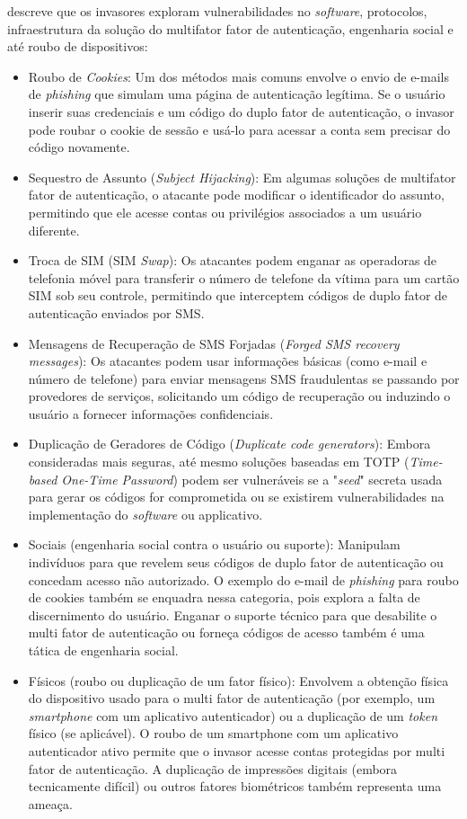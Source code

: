 \documentclass[12pt]{article}
\begin{document}
\cite{article:3} descreve que os invasores exploram vulnerabilidades no \textit{software},
protocolos, infraestrutura da solução do multifator fator de autenticação, engenharia social
e até roubo de dispositivos:
\begin{itemize}
  \item Roubo de \textit{Cookies}: Um dos métodos mais comuns envolve o envio de e-mails de
  \textit{phishing} que simulam uma página de autenticação legítima.
  Se o usuário inserir suas credenciais e um código do duplo fator de autenticação, o invasor
  pode roubar o cookie de sessão e usá-lo para acessar a conta sem precisar do código
  novamente.
  \item Sequestro de Assunto (\textit{Subject Hijacking}): Em algumas soluções de multifator fator de
  autenticação, o atacante pode modificar o identificador do assunto, permitindo que ele
  acesse contas ou privilégios associados a um usuário diferente.
  \item Troca de SIM (SIM \textit{Swap}): Os atacantes podem enganar as operadoras de telefonia móvel
  para transferir o número de telefone da vítima para um cartão SIM sob seu controle,
  permitindo que interceptem códigos de duplo fator de autenticação enviados por SMS.
  \item Mensagens de Recuperação de SMS Forjadas (\textit{Forged SMS recovery messages}): Os
  atacantes podem usar informações básicas (como e-mail e número de telefone) para enviar
  mensagens SMS fraudulentas se passando por provedores de serviços, solicitando um código de
  recuperação ou induzindo o usuário a fornecer informações confidenciais.
  \item Duplicação de Geradores de Código (\textit{Duplicate code generators}): Embora consideradas
  mais seguras, até mesmo soluções baseadas em TOTP (\textit{Time-based One-Time Password}) podem ser
  vulneráveis se a "\textit{seed}" secreta usada para gerar os códigos for comprometida ou se
  existirem vulnerabilidades na implementação do \textit{software} ou  applicativo.
  \item Sociais (engenharia social contra o usuário ou suporte): Manipulam indivíduos para
  que revelem seus códigos de duplo fator de autenticação ou concedam acesso não autorizado.
  O exemplo do e-mail de \textit{phishing} para roubo de cookies também se enquadra nessa categoria,
  pois explora a falta de discernimento do usuário.
  Enganar o suporte técnico para que desabilite o multi fator de autenticação ou forneça
  códigos de acesso também é uma tática de engenharia social.
  \item Físicos (roubo ou duplicação de um fator físico): Envolvem a obtenção física do
  dispositivo usado para o multi fator de autenticação (por exemplo, um \textit{smartphone} com um
  aplicativo autenticador) ou a duplicação de um \textit{token} físico (se aplicável).
  O roubo de um smartphone com um aplicativo autenticador ativo permite que o invasor acesse
  contas protegidas por multi fator de autenticação.
  A duplicação de impressões digitais (embora tecnicamente difícil) ou outros fatores
  biométricos também representa uma ameaça.
\end{itemize}
\end{document}
